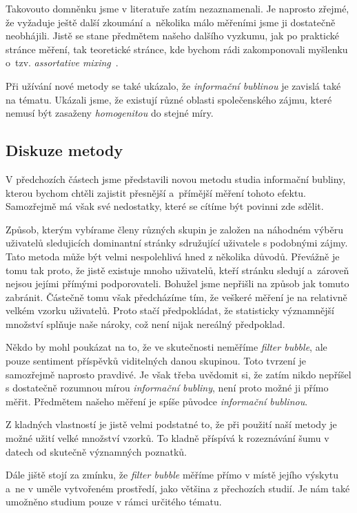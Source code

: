 \documentclass[12pt, a4paper]{article}
\numberwithin{equation}{section} 	%
\begin{document}
Takovouto domněnku jsme v literatuře zatím nezaznamenali. Je naprosto zřejmé, že vyžaduje ještě další zkoumání a~několika málo měřeními jsme ji dostatečně neobhájili. Jistě se stane předmětem našeho dalšího vyzkumu, jak po praktické stránce měření, tak teoretické stránce, kde bychom rádi zakomponovali myšlenku o~tzv. \textit{assortative mixing}~\cite{AssortativeMixing-soc, AssortativeMixing-E}.

Při užívání nové metody se také ukázalo, že \textit{informační bublinou} je zavislá také na tématu. Ukázali jsme, že existují různé oblasti společenského zájmu, které nemusí být zasaženy \textit{homogenitou} do stejné míry.

\subsection{Diskuze metody}
\noindent V předchozích částech jsme představili novou metodu studia informační bubliny, kterou bychom chtěli zajistit přesnější a~přímější měření tohoto efektu. Samozřejmě má však své nedostatky, které se cítíme být povinni zde sdělit.

Způsob, kterým vybírame členy různých skupin je založen na náhodném vý\-bě\-ru uživatelů sledujicích dominantní stránky sdružující uživatele s podobnými zájmy. Tato metoda může být velmi nespolehlivá hned z několika důvodů. Pře\-váž\-ně je tomu tak proto, že jistě existuje mnoho uživatelů, kteří stránku sledují a~zároveň nejsou jejími přímými podporovateli. Bohužel jsme nepřišli na způsob jak tomuto zabránit. Částečně tomu však předcházíme tím, že veškeré měření je na relativně velkém vzorku uživatelů. Proto stačí předpokládat, že statisticky významnější množství splňuje naše nároky, což není nijak nereálný předpoklad.

Někdo by mohl poukázat na to, že ve skutečnosti neměříme \textit{filter bubble}, ale pouze sentiment příspěvků viditelných danou skupinou. Toto tvrzení je samozřejmě naprosto pravdivé. Je však třeba uvědomit si, že zatím nikdo nepříšel s dostatečně rozumnou mírou \textit{informační bubliny}, není proto možné ji přímo měřit. Předmětem našeho měření je spíše původce \textit{informační bublinou}.

Z kladných vlastností je jistě velmi podstatné to, že při použití naší metody je možné užití velké množství vzorků. To kladně příspívá k rozeznávání šumu v datech od skutečně významných poznatků.

Dále jiště stojí za zmínku, že \textit{filter bubble} měříme přímo v místě jejího výskytu a~ne v uměle vytvořeném prostředí, jako většina z přechozích studií. Je nám také umožněno studium pouze v rámci určitého tématu.
\end{document}
